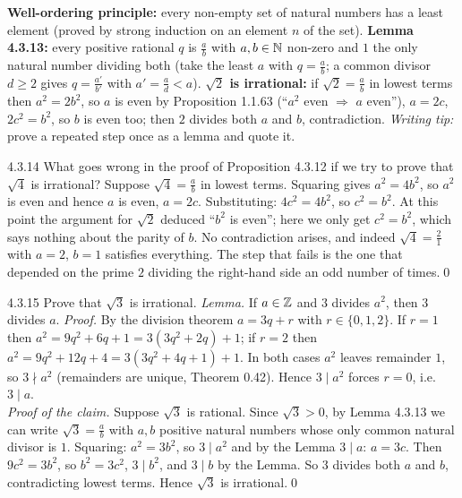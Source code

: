 \begin{result}
\textbf{Well-ordering principle:} every non-empty set of natural numbers has a least element (proved by strong induction on an element $n$ of the set). \textbf{Lemma 4.3.13:} every positive rational $q$ is $\frac ab$ with $a,b\in\mathbb{N}$ non-zero and $1$ the only natural number dividing both (take the least $a$ with $q=\frac ab$; a common divisor $d\ge2$ gives $q=\frac{a'}{b'}$ with $a'=\frac ad<a$). \textbf{$\sqrt2$ is irrational:} if $\sqrt2=\frac ab$ in lowest terms then $a^2=2b^2$, so $a$ is even by Proposition 1.1.63 (``$a^2$ even $\Rightarrow$ $a$ even''), $a=2c$, $2c^2=b^2$, so $b$ is even too; then $2$ divides both $a$ and $b$, contradiction. \emph{Writing tip:} prove a repeated step once as a lemma and quote it.
\end{result}

\begin{bookex}[essential]{4.3.14}
What goes wrong in the proof of Proposition 4.3.12 if we try to prove that $\sqrt4$ is irrational?
\solution
Suppose $\sqrt4=\frac ab$ in lowest terms. Squaring gives $a^2=4b^2$, so $a^2$ is even and hence $a$ is even, $a=2c$. Substituting: $4c^2=4b^2$, so $c^2=b^2$. At this point the argument for $\sqrt2$ deduced ``$b^2$ is even''; here we only get $c^2=b^2$, which says nothing about the parity of $b$. No contradiction arises, and indeed $\sqrt4=\frac21$ with $a=2$, $b=1$ satisfies everything. The step that fails is the one that depended on the prime $2$ dividing the right-hand side an odd number of times.\qed
\end{bookex}

\begin{bookex}[essential]{4.3.15}
Prove that $\sqrt3$ is irrational.
\solution
\emph{Lemma.} If $a\in\mathbb{Z}$ and $3$ divides $a^2$, then $3$ divides $a$. \emph{Proof.} By the division theorem $a=3q+r$ with $r\in\{0,1,2\}$. If $r=1$ then $a^2=9q^2+6q+1=3(3q^2+2q)+1$; if $r=2$ then $a^2=9q^2+12q+4=3(3q^2+4q+1)+1$. In both cases $a^2$ leaves remainder $1$, so $3\nmid a^2$ (remainders are unique, Theorem 0.42). Hence $3\mid a^2$ forces $r=0$, i.e.\ $3\mid a$.\\
\emph{Proof of the claim.} Suppose $\sqrt3$ is rational. Since $\sqrt3>0$, by Lemma 4.3.13 we can write $\sqrt3=\frac ab$ with $a,b$ positive natural numbers whose only common natural divisor is $1$. Squaring: $a^2=3b^2$, so $3\mid a^2$ and by the Lemma $3\mid a$: $a=3c$. Then $9c^2=3b^2$, so $b^2=3c^2$, $3\mid b^2$, and $3\mid b$ by the Lemma. So $3$ divides both $a$ and $b$, contradicting lowest terms. Hence $\sqrt3$ is irrational.\qed
\end{bookex}

